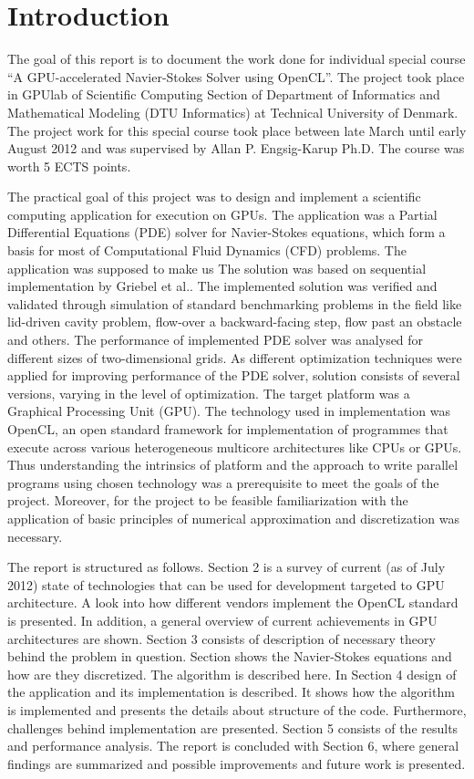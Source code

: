 \chapter{Introduction}
The goal of this report is to document the work done for individual special course \enquote{A GPU-accelerated Navier-Stokes Solver using OpenCL}. The project took place in GPUlab of Scientific Computing Section of Department of Informatics and Mathematical Modeling (DTU Informatics) at Technical University of Denmark. The project work for this special course took place between late March until early August 2012 and was supervised by Allan P. Engsig-Karup Ph.D. The course was worth 5 ECTS points.

The practical goal of this project was to design and implement a scientific computing application for execution on GPUs. The application was a Partial Differential Equations (PDE) solver for Navier-Stokes equations, which form a basis for most of Computational Fluid Dynamics (CFD) problems. The application was supposed to make us  The solution was based on sequential implementation by Griebel et al.\cite{griebel1998numerical}. The implemented solution was verified and validated through simulation of standard benchmarking problems in the field like lid-driven cavity problem, flow-over a backward-facing step, flow past an obstacle and others. The performance of implemented PDE solver was analysed for different sizes of two-dimensional grids. As different optimization techniques were applied for improving performance of the PDE solver, solution consists of several versions, varying in the level of optimization. The target platform was a Graphical Processing Unit (GPU). The technology used in implementation was OpenCL, an open standard framework for implementation of programmes that execute across various heterogeneous multicore architectures like CPUs or GPUs. Thus understanding the intrinsics of platform and the approach to write parallel programs using chosen technology was a prerequisite to meet the goals of the project. Moreover, for the project to be feasible familiarization with the application of basic principles of numerical approximation and discretization was necessary.

The report is structured as follows. Section 2 is a survey of current (as of July 2012) state of technologies that can be used for development targeted to GPU architecture. A look into how different vendors implement the OpenCL standard is presented. In addition, a general overview of current achievements in GPU architectures are shown. Section 3 consists of description of necessary theory behind the problem in question. Section shows the Navier-Stokes equations and how are they discretized. The algorithm is described here. In Section 4 design of the application and its implementation is described. It shows how the algorithm is implemented and presents the details about structure of the code. Furthermore, challenges behind implementation are presented. Section 5 consists of the results and performance analysis. The report is concluded with Section 6, where general findings are summarized and possible improvements and future work is presented.